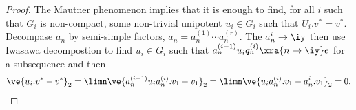 \begin{proof}
The Mautner phenomenon implies that it is enough to find, for all $i$ such that $G_i$ is non-compact, some non-trivial unipotent $u_i\in G_i$ such that $U_i.v^*=v^*$. 
Decompase $a_n$ by semi-simple factors, $a_n=a_n^{(1)}\cdots a_n^{(r)}$. The $a_n^i\to \iy$ then use Iwasawa decompostion to find $u_i\in G_i$ such that $a_n^{(i-1)}u_i q_n^{(i)}\xra{n\to \iy}e$ for a subsequence and then 
\begin{align}
\ve{u_i.v^* - v^*}_2=\limn
\ve{a_n^{(i-1)}u_i a_n^{(i)}.v_1 - v_1}_2 =
\limn
\ve{u_i a_n^{(i)}.v_1 -a_n^i. v_1}_2 =0. 
\end{align}
\end{proof}


